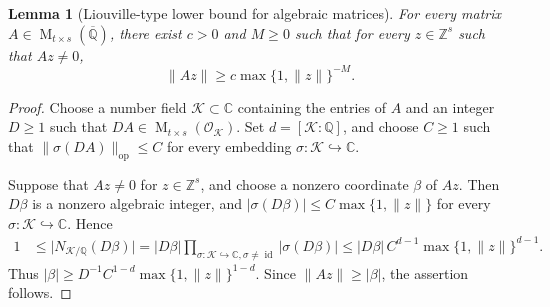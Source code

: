 \documentclass[reqno,11pt]{amsart}
\numberwithin{equation}{section}
\newtheorem{lemma}[theorem]{Lemma}
\theoremstyle{definition}
\theoremstyle{remark}
\newcommand{\op}{\operatorname}
\newcommand{\q}{\mathbb Q}
\begin{document}
\begin{lemma}[Liouville-type lower bound for algebraic matrices]
\label{lem:algebraic-linear-map}
For every matrix $A\in\op{M}_{t\times s}(\overline{\q})$, there exist
 $c>0$ and $M\ge0$ such that for every $z\in \mathbb Z^s$ such that $Az\ne 0$,  
$$
\|Az\|\ge c\max\{1,\|z\|\}^{-M}.
$$
\end{lemma}
\begin{proof}
Choose a number field $\mathscr K\subset\mathbb C$ containing the entries
of $A$ and an integer $D\ge1$ such that
$DA\in\op{M}_{t\times s}(\mathcal O_{\mathscr K})$. Set
$d=[\mathscr K:\mathbb Q]$, and choose $C\ge1$ such that
$\|\sigma(DA)\|_{\mathrm{op}}\le C$ for every embedding
$\sigma:\mathscr K\hookrightarrow\mathbb C$.

Suppose that $Az\ne0$ for $z\in\mathbb Z^s$, and choose a nonzero
coordinate $\beta$ of $Az$. Then $D\beta$ is a nonzero algebraic integer,
and
$|\sigma(D\beta)|\le C\max\{1,\|z\|\}$ for every $\sigma:\mathscr K\hookrightarrow\mathbb C$.
Hence
$$
\begin{aligned}
1
&\le \bigl|N_{\mathscr K/\mathbb Q}(D\beta)\bigr|
=
|D\beta|
\prod_{{\sigma:\mathscr K\hookrightarrow\mathbb C, \sigma\ne\operatorname{id}}}
|\sigma(D\beta)| \le
|D\beta|\,C^{d-1}\max\{1,\|z\|\}^{d-1}.
\end{aligned}
$$
Thus
$|\beta|\ge D^{-1}C^{1-d}\max\{1,\|z\|\}^{1-d}$.
Since $\|Az\|\ge|\beta|$, the assertion follows.
\end{proof}
\end{document}
